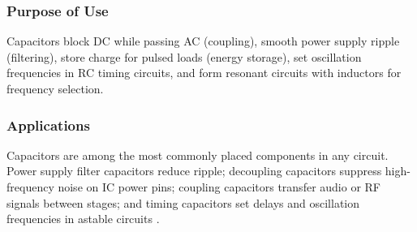 \subsubsection*{Purpose of Use}
Capacitors block DC while passing AC (coupling), smooth power supply ripple (filtering),
store charge for pulsed loads (energy storage), set oscillation frequencies in RC timing
circuits, and form resonant circuits with inductors for frequency selection.

\subsubsection*{Applications}
Capacitors are among the most commonly placed components in any circuit. Power supply
filter capacitors reduce ripple; decoupling capacitors suppress high-frequency noise on
IC power pins; coupling capacitors transfer audio or RF signals between stages; and
timing capacitors set delays and oscillation frequencies in astable circuits
\cite{horowitz2015}.


